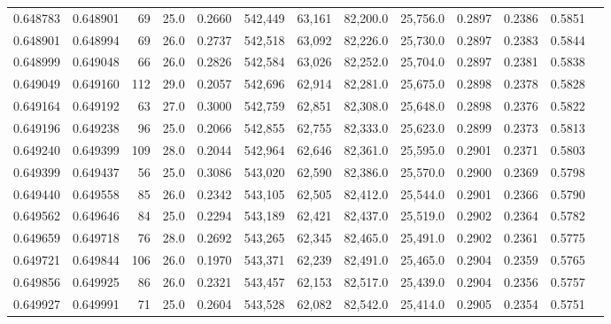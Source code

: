 \begin{tabular}{rrrrrrrrrrrrr}
0.648783 & 0.648901 &    69 & 25.0 &                                     0.2660 & 542,449 &  63,161 &  82,200.0 &  25,756.0 & 0.2897 & 0.2386 & 0.5851 \\
0.648901 & 0.648994 &    69 & 26.0 &                                     0.2737 & 542,518 &  63,092 &  82,226.0 &  25,730.0 & 0.2897 & 0.2383 & 0.5844 \\
0.648999 & 0.649048 &    66 & 26.0 &                                     0.2826 & 542,584 &  63,026 &  82,252.0 &  25,704.0 & 0.2897 & 0.2381 & 0.5838 \\
0.649049 & 0.649160 &   112 & 29.0 &                                     0.2057 & 542,696 &  62,914 &  82,281.0 &  25,675.0 & 0.2898 & 0.2378 & 0.5828 \\
0.649164 & 0.649192 &    63 & 27.0 &                                     0.3000 & 542,759 &  62,851 &  82,308.0 &  25,648.0 & 0.2898 & 0.2376 & 0.5822 \\
0.649196 & 0.649238 &    96 & 25.0 &                                     0.2066 & 542,855 &  62,755 &  82,333.0 &  25,623.0 & 0.2899 & 0.2373 & 0.5813 \\
0.649240 & 0.649399 &   109 & 28.0 &                                     0.2044 & 542,964 &  62,646 &  82,361.0 &  25,595.0 & 0.2901 & 0.2371 & 0.5803 \\
0.649399 & 0.649437 &    56 & 25.0 &                                     0.3086 & 543,020 &  62,590 &  82,386.0 &  25,570.0 & 0.2900 & 0.2369 & 0.5798 \\
0.649440 & 0.649558 &    85 & 26.0 &                                     0.2342 & 543,105 &  62,505 &  82,412.0 &  25,544.0 & 0.2901 & 0.2366 & 0.5790 \\
0.649562 & 0.649646 &    84 & 25.0 &                                     0.2294 & 543,189 &  62,421 &  82,437.0 &  25,519.0 & 0.2902 & 0.2364 & 0.5782 \\
0.649659 & 0.649718 &    76 & 28.0 &                                     0.2692 & 543,265 &  62,345 &  82,465.0 &  25,491.0 & 0.2902 & 0.2361 & 0.5775 \\
0.649721 & 0.649844 &   106 & 26.0 &                                     0.1970 & 543,371 &  62,239 &  82,491.0 &  25,465.0 & 0.2904 & 0.2359 & 0.5765 \\
0.649856 & 0.649925 &    86 & 26.0 &                                     0.2321 & 543,457 &  62,153 &  82,517.0 &  25,439.0 & 0.2904 & 0.2356 & 0.5757 \\
0.649927 & 0.649991 &    71 & 25.0 &                                     0.2604 & 543,528 &  62,082 &  82,542.0 &  25,414.0 & 0.2905 & 0.2354 & 0.5751 \\

\end{tabular}
